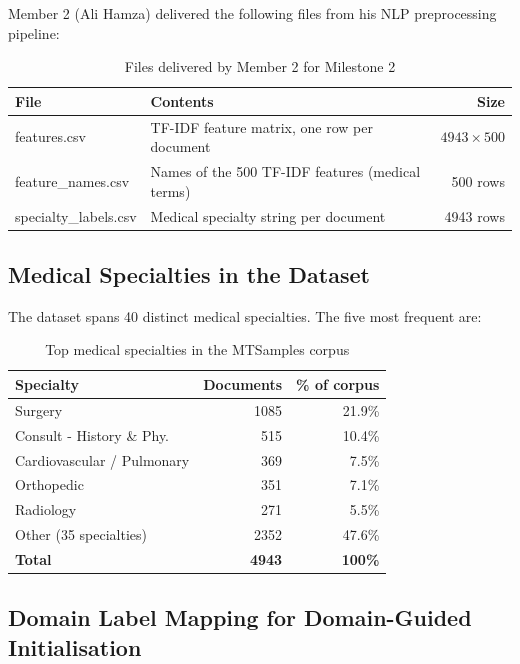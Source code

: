 \documentclass[12pt,a4paper]{article}
\begin{document}
Member 2 (Ali Hamza) delivered the following files from his NLP preprocessing pipeline:

\begin{table}[H]
\centering
\begin{tabularx}{\textwidth}{>{\ttfamily}l X r}
\toprule
\textbf{File} & \textbf{Contents} & \textbf{Size} \\
\midrule
features.csv         & TF-IDF feature matrix, one row per document  & $4943 \times 500$ \\
feature\_names.csv   & Names of the 500 TF-IDF features (medical terms) & 500 rows \\
specialty\_labels.csv & Medical specialty string per document         & 4943 rows \\
\bottomrule
\end{tabularx}
\caption{Files delivered by Member 2 for Milestone 2}
\end{table}

\subsection{Medical Specialties in the Dataset}

The dataset spans 40 distinct medical specialties. The five most frequent are:

\begin{table}[H]
\centering
\begin{tabular}{lrr}
\toprule
\textbf{Specialty} & \textbf{Documents} & \textbf{\% of corpus} \\
\midrule
Surgery                    & 1085 & 21.9\% \\
Consult - History \& Phy.  & 515  & 10.4\% \\
Cardiovascular / Pulmonary & 369  &  7.5\% \\
Orthopedic                 & 351  &  7.1\% \\
Radiology                  & 271  &  5.5\% \\
\midrule
Other (35 specialties)     & 2352 & 47.6\% \\
\midrule
\textbf{Total}             & \textbf{4943} & \textbf{100\%} \\
\bottomrule
\end{tabular}
\caption{Top medical specialties in the MTSamples corpus}
\end{table}

\subsection{Domain Label Mapping for Domain-Guided Initialisation}
\end{document}
